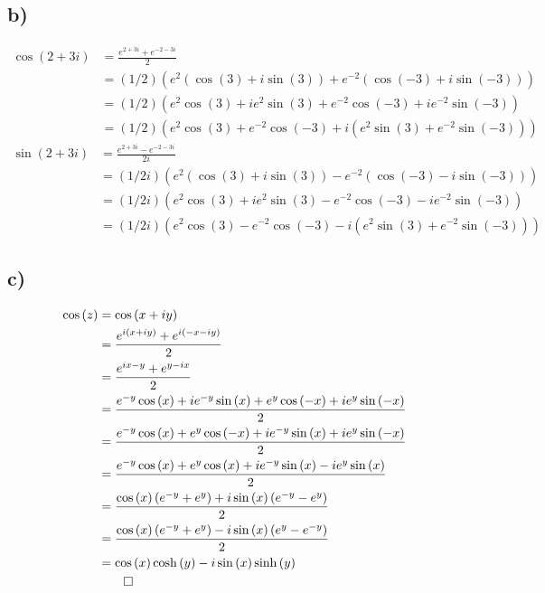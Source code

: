 \documentclass[12pt]{article}
\begin{document}
\subsection{b)}
\begin{align*}
	\cos{(2 + 3i)} &= \frac{e^{2+3i} + e^{-2-3i}}{2}\\
	&= (1/2) \left(e^2(\cos{(3)} + i\sin{(3)}) + e^{-2}(\cos{(-3)} + i\sin{(-3)})\right)\\
	&= (1/2) \left(e^2\cos{(3)} + ie^2\sin{(3)} + e^{-2}\cos{(-3)} + ie^{-2}\sin{(-3)}\right)\\
	&= (1/2) \left( e^2\cos({3}) +e^{-2}\cos{(-3)} + i\left(e^2\sin{(3)} + e^{-2}\sin{(-3)}\right) \right)
\end{align*}
\begin{align*}
	\sin{(2 + 3i)} &= \frac{e^{2+3i} - e^{-2-3i}}{2i}\\
	&= (1/2i) \left(e^2(\cos{(3)} + i\sin{(3)}) - e^{-2}(\cos{(-3)} - i\sin{(-3)})\right)\\
	&= (1/2i) \left(e^2\cos{(3)} + ie^2\sin{(3)} - e^{-2}\cos{(-3)} - ie^{-2}\sin{(-3)}\right)\\
	&= (1/2i) \left( e^2\cos({3}) -e^{-2}\cos{(-3)} - i\left(e^2\sin{(3)} + e^{-2}\sin{(-3)}\right) \right)
\end{align*}
\subsection{c)}
\begin{align*}
	\cos{(z)} &= \cos{(x+iy)}\\
	&= \frac{e^{i(x+iy)} + e^{i(-x-iy)}}{2}\\
	&= \frac{e^{ix-y} + e^{y-ix}}{2}\\
	&= \frac{e^{-y}\cos{(x)} + ie^{-y}\sin{(x)} + e^{y}\cos{(-x)} + ie^{y}\sin{(-x)}}{2}\\
	&= \frac{e^{-y}\cos{(x)} + e^{y}\cos{(-x)} + ie^{-y}\sin{(x)} + ie^{y}\sin{(-x)}}{2}\\
	&= \frac{e^{-y}\cos{(x)} + e^{y}\cos{(x)} + ie^{-y}\sin{(x)} - ie^{y}\sin{(x)}}{2}\\
	&= \frac{\cos{(x)}\left(e^{-y}+ e^{y}\right) + i\sin{(x)}\left(e^{-y} - e^{y}\right)}{2}\\
	&= \frac{\cos{(x)}\left(e^{-y}+ e^{y}\right) - i\sin{(x)}\left(e^{y} - e^{-y}\right)}{2}\\
	&= \cos{(x)}\cosh{(y)} - i\sin{(x)}\sinh{(y)}\\
	&\qed
\end{align*}
\end{document}
